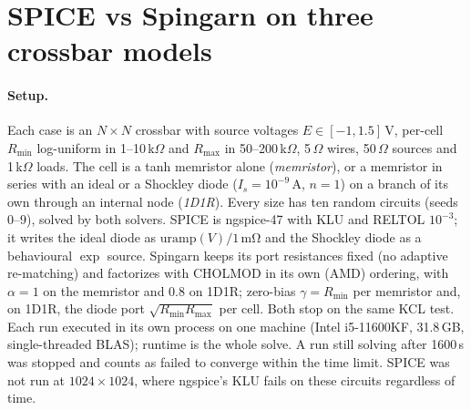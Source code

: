 \documentclass[11pt]{article}
\begin{document}
\section*{SPICE vs Spingarn on three crossbar models}

\paragraph{Setup.}
Each case is an $N\times N$ crossbar with source voltages $E\in[-1, 1.5]$\,V, per-cell $R_{\min}$ log-uniform in
1--10\,k$\Omega$ and $R_{\max}$ in 50--200\,k$\Omega$, 5\,$\Omega$ wires, 50\,$\Omega$ sources and 1\,k$\Omega$ loads.
The cell is a tanh memristor alone (\emph{memristor}), or a memristor in series with an ideal or a Shockley diode
($I_s = 10^{-9}$\,A, $n = 1$) on a branch of its own through an internal node (\emph{1D1R}). Every size has ten random
circuits (seeds 0--9), solved by both solvers. SPICE is ngspice-47 with KLU and RELTOL $10^{-3}$; it writes the ideal
diode as $\mathrm{uramp}(V)/1\,\mathrm{m\Omega}$ and the Shockley diode as a behavioural $\exp$ source. Spingarn keeps
its port resistances fixed (no adaptive re-matching) and factorizes with CHOLMOD in its own (AMD) ordering, with
$\alpha = 1$ on the memristor and $0.8$ on 1D1R; zero-bias $\gamma = R_{\min}$ per memristor and, on 1D1R, the diode
port $\sqrt{R_{\min}R_{\max}}$ per cell. Both stop on the same KCL test. Each run executed in its own process on one
machine (Intel i5-11600KF, 31.8\,GB, single-threaded BLAS); runtime is the whole solve. A run still solving after
1600\,s was stopped and counts as failed to converge within the time limit. SPICE was not run at $1024\times1024$,
where ngspice's KLU fails on these circuits regardless of time.
\end{document}
